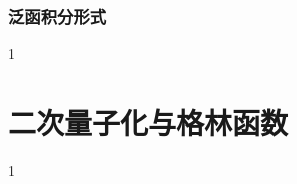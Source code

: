 \subsubsection{泛函积分形式}
1
\section{二次量子化与格林函数}
1


















































	
\ifx\allfiles\undefined

	\else
	\fi
